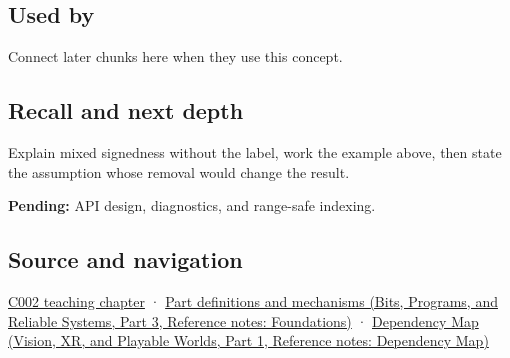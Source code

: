 \subsection{Used by}\label{appendix-736a2345de4a-used-by}

\hypertarget{appendix-736a2345de4a-used-by}{}

Connect later chunks here when they use this concept.

\subsection{Recall and next depth}\label{appendix-736a2345de4a-recall-and-next-depth}

\hypertarget{appendix-736a2345de4a-recall-and-next-depth}{}

Explain mixed signedness without the label, work the example above, then state the assumption whose removal would change the result.

\textbf{Pending:} API design, diagnostics, and range-safe indexing.

\subsection{Source and navigation}\label{appendix-736a2345de4a-source-and-navigation}

\hypertarget{appendix-736a2345de4a-source-and-navigation}{}

\hyperref[01-foundations-i-ch001-arithmetic-becomes-a-policy]{C002 teaching chapter} · \href{../01-Bits-Programs-and-Reliable-Systems-P03/main.pdf\#appendix-fd090d982a15}{Part definitions and mechanisms (Bits, Programs, and Reliable Systems, Part 3, Reference notes: Foundations)} · \href{../07-Vision-XR-and-Playable-Worlds-P01/main.pdf\#appendix-4ad47bdd269a}{Dependency Map (Vision, XR, and Playable Worlds, Part 1, Reference notes: Dependency Map)}
